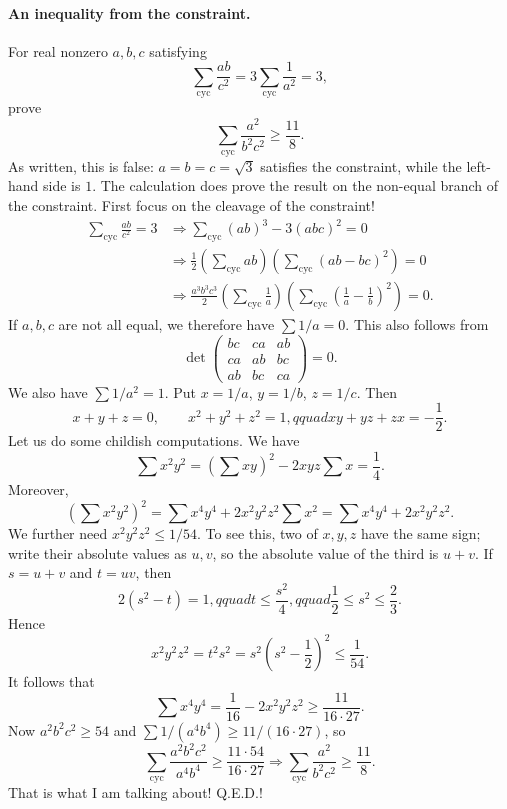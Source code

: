 \documentclass[11pt,a4paper]{article}
\begin{document}
\paragraph{An inequality from the constraint.}
For real nonzero $a,b,c$ satisfying
\[
\sum_{\mathrm{cyc}}\frac{ab}{c^2}
=3\sum_{\mathrm{cyc}}\frac1{a^2}=3,
\]
prove
\[
\sum_{\mathrm{cyc}}\frac{a^2}{b^2c^2}\geq\frac{11}{8}.
\]
As written, this is false: $a=b=c=\sqrt3$ satisfies the constraint, while
the left-hand side is $1$. The calculation does prove the result on the
non-equal branch of the constraint. First focus on the cleavage of the constraint!
\begin{align*}
\sum_{\mathrm{cyc}}\frac{ab}{c^2}=3
&\Longrightarrow\sum_{\mathrm{cyc}}(ab)^3-3(abc)^2=0\\
&\Longrightarrow\frac12\left(\sum_{\mathrm{cyc}}ab\right)
\left(\sum_{\mathrm{cyc}}(ab-bc)^2\right)=0\\
&\Longrightarrow\frac{a^3b^3c^3}2
\left(\sum_{\mathrm{cyc}}\frac1a\right)
\left(\sum_{\mathrm{cyc}}\left(\frac1a-\frac1b\right)^2\right)=0.
\end{align*}
If $a,b,c$ are not all equal, we therefore have $\sum1/a=0$. This also follows from
\[
\det\begin{pmatrix}
bc&ca&ab\\
ca&ab&bc\\
ab&bc&ca
\end{pmatrix}=0.
\]
We also have $\sum1/a^2=1$. Put $x=1/a$, $y=1/b$, $z=1/c$.
Then
\[
x+y+z=0,\qquad x^2+y^2+z^2=1,qquad xy+yz+zx=-\frac12.
\]
Let us do some childish computations. We have
\[
\sum x^2y^2=(\sum xy)^2-2xyz\sum x=\frac14.
\]
Moreover,
\[
(\sum x^2y^2)^2
=\sum x^4y^4+2x^2y^2z^2\sum x^2
=\sum x^4y^4+2x^2y^2z^2.
\]
We further need $x^2y^2z^2\leq1/54$. To see this, two of $x,y,z$
have the same sign; write their absolute values as $u,v$, so the absolute
value of the third is $u+v$. If $s=u+v$ and $t=uv$, then
\[
2(s^2-t)=1,qquad t\leq\frac{s^2}{4},qquad
\frac12\leq s^2\leq\frac23.
\]
Hence
\[
x^2y^2z^2=t^2s^2=s^2\left(s^2-\frac12\right)^2\leq\frac1{54}.
\]
It follows that
\[
\sum x^4y^4=\frac1{16}-2x^2y^2z^2
\geq\frac{11}{16\cdot27}.
\]
Now $a^2b^2c^2\geq54$ and
$\sum1/(a^4b^4)\geq11/(16\cdot27)$, so
\[
\sum_{\mathrm{cyc}}\frac{a^2b^2c^2}{a^4b^4}
\geq\frac{11\cdot54}{16\cdot27}
\Longrightarrow
\sum_{\mathrm{cyc}}\frac{a^2}{b^2c^2}\geq\frac{11}8.
\]
That is what I am talking about! Q.E.D.!

\end{document}
